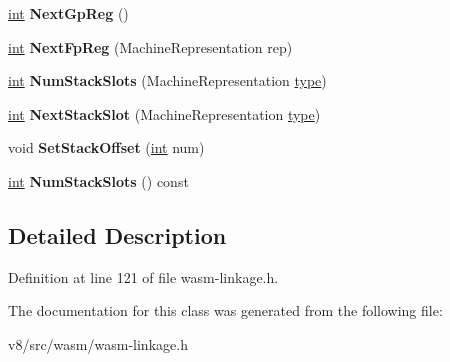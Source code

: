 \begin{DoxyCompactItemize}
\mbox{\hyperlink{classint}{int}} {\bfseries Next\+Gp\+Reg} ()
\item 
\mbox{\label{classv8_1_1internal_1_1wasm_1_1LinkageAllocator_a5b540690cf61eb431388a182b488aa77}} 
\mbox{\hyperlink{classint}{int}} {\bfseries Next\+Fp\+Reg} (Machine\+Representation rep)
\item 
\mbox{\label{classv8_1_1internal_1_1wasm_1_1LinkageAllocator_a86d5b8e7f9f948935551b325ebd81220}} 
\mbox{\hyperlink{classint}{int}} {\bfseries Num\+Stack\+Slots} (Machine\+Representation \mbox{\hyperlink{classstd_1_1conditional_1_1type}{type}})
\item 
\mbox{\label{classv8_1_1internal_1_1wasm_1_1LinkageAllocator_a3af30c37b18d63128c626e7def2899e7}} 
\mbox{\hyperlink{classint}{int}} {\bfseries Next\+Stack\+Slot} (Machine\+Representation \mbox{\hyperlink{classstd_1_1conditional_1_1type}{type}})
\item 
\mbox{\label{classv8_1_1internal_1_1wasm_1_1LinkageAllocator_a3732bd0d98c84ba7414f00eede068041}} 
void {\bfseries Set\+Stack\+Offset} (\mbox{\hyperlink{classint}{int}} num)
\item 
\mbox{\label{classv8_1_1internal_1_1wasm_1_1LinkageAllocator_a790a117ee5c0168107d77d98554dc086}} 
\mbox{\hyperlink{classint}{int}} {\bfseries Num\+Stack\+Slots} () const
\end{DoxyCompactItemize}


\subsection{Detailed Description}


Definition at line 121 of file wasm-\/linkage.\+h.



The documentation for this class was generated from the following file\+:\begin{DoxyCompactItemize}
\item 
v8/src/wasm/wasm-\/linkage.\+h\end{DoxyCompactItemize}
